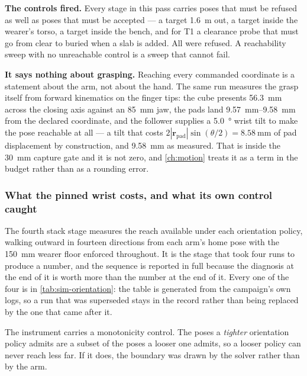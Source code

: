 \textbf{The controls fired.} Every stage in this pass carries poses that must
be refused as well as poses that must be accepted --- a target
\SI{1.6}{\metre} out, a target inside the wearer's torso, a target inside the
bench, and for T1 a clearance probe that must go from clear to buried when a
slab is added. All were refused. A reachability sweep with no unreachable
control is a sweep that cannot fail.

\textbf{It says nothing about grasping.} Reaching every commanded coordinate
is a statement about the arm, not about the hand. The same run measures the
grasp itself from forward kinematics on the finger tips: the cube presents
\SI{56.3}{\milli\metre} across the closing axis against an
\SI{85}{\milli\metre} jaw, the pads land \SIrange{9.57}{9.58}{\milli\metre}
from the declared coordinate, and the follower supplies a \SI{5.0}{\degree}
wrist tilt to make the pose reachable at all --- a tilt that costs
$2|\mathbf{r}_{\text{pad}}|\sin(\theta/2) = \SI{8.58}{\milli\metre}$ of pad
displacement by construction, and \SI{9.58}{\milli\metre} as measured. That
is inside the \SI{30}{\milli\metre} capture gate and it is not zero, and
\cref{ch:motion} treats it as a term in the budget rather than as a rounding
error.

\subsubsection{What the pinned wrist costs, and what its own control caught}

The fourth stack stage measures the reach available under each orientation
policy, walking outward in fourteen directions from each arm's home pose with
the \SI{150}{\milli\metre} wearer floor enforced throughout. It is the stage
that took four runs to produce a number, and the sequence is reported in full
because the diagnosis at the end of it is worth more than the number at the
end of it. Every one of the four is in \cref{tab:sim-orientation}: the table
is generated from the campaign's own logs, so a run that was superseded stays
in the record rather than being replaced by the one that came after it.

The instrument carries a monotonicity control. The poses a \emph{tighter}
orientation policy admits are a subset of the poses a looser one admits, so a
looser policy can never reach less far. If it does, the boundary was drawn by
the solver rather than by the arm.

\begin{table}[htbp]
  \centering
  \small
  \caption[Reach against orientation policy, at each sampling density]{The
  same measurement at every seed count it was run at. Mean reach over
  \num{28} directional walks, by how tightly the commanded wrist is
  constrained; the \emph{pinned} row is what teleoperation actually runs.
  Generated from the campaign's own logs, so a further run adds a column
  rather than replacing one --- which is the point, because the finding here
  is the difference between the columns.}
  \label{tab:sim-orientation}
  
\end{table}

